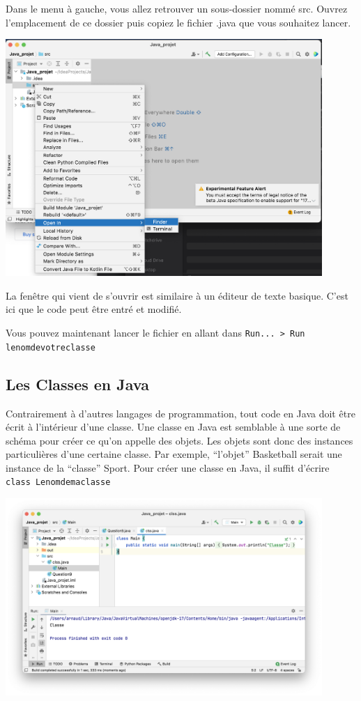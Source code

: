 Dans le menu à gauche, vous allez retrouver un sous-dossier nommé src. Ouvrez l'emplacement de ce dossier puis copiez le fichier .java que vous souhaitez lancer.

\begin{center}
	\includegraphics[width=12cm]{6j}	
\end{center}

La fenêtre qui vient de s'ouvrir est similaire à un éditeur de texte basique. C'est ici que le code peut être entré et modifié.

Vous pouvez maintenant lancer le fichier en allant dans \lstinline{Run... > Run lenomdevotreclasse}

\subsection{Les Classes en Java}

Contrairement à d'autres langages de programmation, tout code en Java doit être écrit à l'intérieur d'une classe. Une classe en Java est semblable à une sorte de schéma pour créer ce qu'on appelle des objets. Les objets sont donc des instances particulières d'une certaine classe. Par exemple, ``l'objet'' Basketball serait une instance de la ``classe'' Sport. Pour créer une classe en Java, il suffit d'écrire \lstinline{class Lenomdemaclasse}

\begin{center}
	\includegraphics[width=12cm]{7j}	
\end{center}

